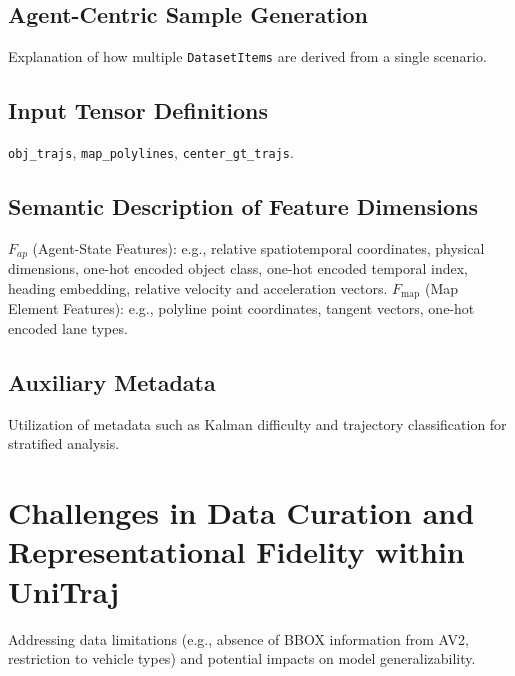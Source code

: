     \subsection{Agent-Centric Sample Generation}
    Explanation of how multiple \texttt{DatasetItems} are derived from a single scenario.
    \subsection{Input Tensor Definitions}
    \texttt{obj\_trajs}, \texttt{map\_polylines}, \texttt{center\_gt\_trajs}.
    \subsection{Semantic Description of Feature Dimensions}
    $F_{ap}$ (Agent-State Features): e.g., relative spatiotemporal coordinates, physical dimensions, one-hot encoded object class, one-hot encoded temporal index, heading embedding, relative velocity and acceleration vectors.
    $F_{\text{map}}$ (Map Element Features): e.g., polyline point coordinates, tangent vectors, one-hot encoded lane types.
    \subsection{Auxiliary Metadata}
    Utilization of metadata such as Kalman difficulty and trajectory classification for stratified analysis.


\section{Challenges in Data Curation and Representational Fidelity within UniTraj}
\label{sec:data_challenges}
Addressing data limitations (e.g., absence of BBOX information from AV2, restriction to vehicle types) and potential impacts on model generalizability.

